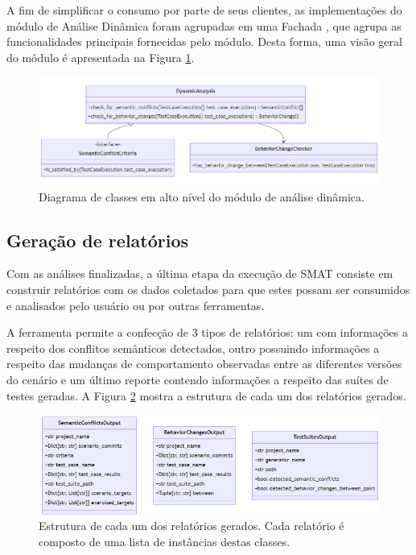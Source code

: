 \documentclass[12pt]{article}
\begin{document}
A fim de simplificar o consumo por parte de seus clientes, as implementações do módulo de Análise Dinâmica foram agrupadas em uma Fachada \cite{gof}, que agrupa as funcionalidades principais fornecidas pelo módulo. Desta forma, uma visão geral do módulo é apresentada na Figura \ref{fig:da}.

\begin{figure}[H]
    \centering
    \includegraphics[width=\textwidth]{imagens/da.png}
    \caption{Diagrama de classes em alto nível do módulo de análise dinâmica.}
    \label{fig:da}
\end{figure}

\subsection{Geração de relatórios}

Com as análises finalizadas, a última etapa da execução de SMAT consiste em construir relatórios com os dados coletados para que estes possam ser consumidos e analisados pelo usuário ou por outras ferramentas.

A ferramenta permite a confecção de 3 tipos de relatórios: um com informações a respeito dos conflitos semânticos detectados, outro possuindo informações a respeito das mudanças de comportamento  observadas entre as diferentes versões do cenário e um último reporte contendo informações a respeito das suítes de testes geradas. A Figura \ref{fig:relatorios} mostra a estrutura de cada um dos relatórios gerados.

\begin{figure}[H]
    \centering
    \includegraphics[width=\textwidth]{imagens/relatorios.png}
    \caption{Estrutura de cada um dos relatórios gerados. Cada relatório é composto de uma lista de instâncias destas classes.}
    \label{fig:relatorios}
\end{figure}
\end{document}
